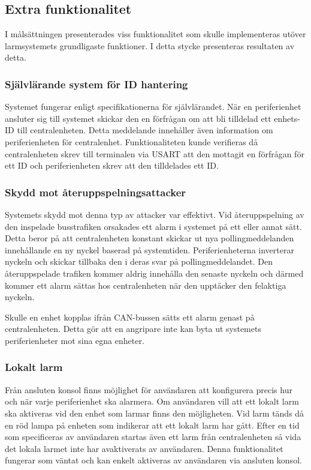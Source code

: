 \documentclass[a4paper]{article}
\begin{document}
\subsection{Extra funktionalitet}
I målsättningen presenterades viss funktionalitet som skulle implementeras utöver larmsystemets grundligaste funktioner.
I detta stycke presenteras resultaten av detta.

\subsubsection{Självlärande system för ID hantering}
Systemet fungerar enligt specifikationerna för självlärandet.
När en periferienhet ansluter sig till systemet skickar den en förfrågan om att bli tilldelad ett enhets-ID till centralenheten.
Detta meddelande innehåller även information om periferienheten för centralenhet.
Funktionaliteten kunde verifieras då centralenheten skrev till terminalen via USART att den mottagit en förfrågan för ett ID och periferienheten skrev att den tilldelades ett ID.

\subsubsection{Skydd mot återuppspelningsattacker}
Systemets skydd mot denna typ av attacker var effektivt.
Vid återuppspelning av den inspelade busstrafiken orsakades ett alarm i systemet på ett eller annat sätt.
Detta beror på att centralenheten konstant skickar ut nya pollingmeddelanden innehållande en ny nyckel baserad på systemtiden.
Periferienheterna inverterar nyckeln och skickar tillbaka den i deras svar på pollingmeddelandet.
Den återuppspelade trafiken kommer aldrig innehålla den senaste nyckeln och därmed kommer ett alarm sättas hos centralenheten när den upptäcker den felaktiga nyckeln.

Skulle en enhet kopplas ifrån CAN-bussen sätts ett alarm genast på centralenheten.
Detta gör att en angripare inte kan byta ut systemets periferienheter mot sina egna enheter.

\subsubsection{Lokalt larm}
Från ansluten konsol finns möjlighet för användaren att konfigurera precis hur och när varje periferienhet ska alarmera.
Om användaren vill att ett lokalt larm ska aktiveras vid den enhet som larmar finns den möjligheten.
Vid larm tänds då en röd lampa på enheten som indikerar att ett lokalt larm har gått.
Efter en tid som specificeras av användaren startas även ett larm från centralenheten så vida det lokala larmet inte har avaktiverats av användaren.
Denna funktionalitet fungerar som väntat och kan enkelt aktiveras av användaren via ansluten konsol.
\end{document}
